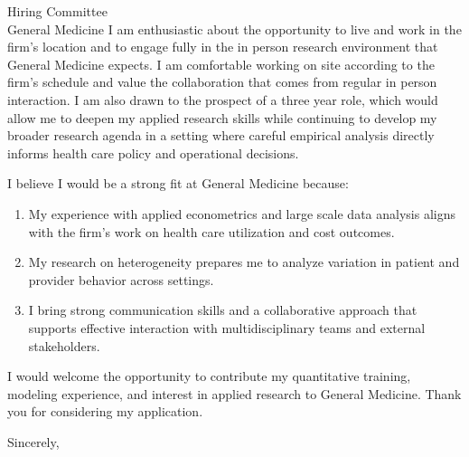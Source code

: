 \documentclass[11pt,letterpaper]{letter}
\begin{document}
\begin{letter}{Hiring Committee \\
General Medicine}
I am enthusiastic about the opportunity to live and work in the firm’s location and to engage fully in the in person research environment that General Medicine expects. I am comfortable working on site according to the firm’s schedule and value the collaboration that comes from regular in person interaction. I am also drawn to the prospect of a three year role, which would allow me to deepen my applied research skills while continuing to develop my broader research agenda in a setting where careful empirical analysis directly informs health care policy and operational decisions.

I believe I would be a strong fit at General Medicine because:
\begin{enumerate}
    \item My experience with applied econometrics and large scale data analysis aligns with the firm’s work on health care utilization and cost outcomes.
    \item My research on heterogeneity prepares me to analyze variation in patient and provider behavior across settings.
    \item I bring strong communication skills and a collaborative approach that supports effective interaction with multidisciplinary teams and external stakeholders.
\end{enumerate}

I would welcome the opportunity to contribute my quantitative training, modeling experience, and interest in applied research to General Medicine. Thank you for considering my application.

\closing{Sincerely,}

\end{letter}
\end{document}
